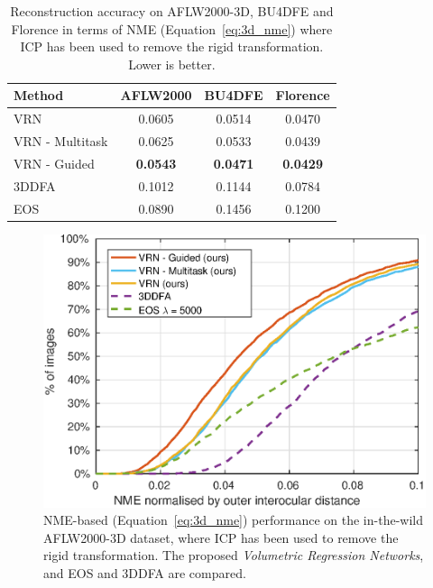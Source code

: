 \begin{table}
  \caption[Numerical performance of 3D face reconstruction with
  ICP]{Reconstruction accuracy on AFLW2000-3D, BU4DFE and Florence in
    terms of NME (Equation~\ref{eq:3d_nme}) where ICP has been used to
    remove the rigid transformation. Lower is better. }
  \label{tab:overviewicp}
  \centering\vspace{1mm}
  \small
\begin{tabular}{|l||c|c|c|}
  \hline
  \textbf{Method}   & \textbf{AFLW2000} & \textbf{BU4DFE} & \textbf{Florence} \\
  \hline\hline
  VRN               & 0.0605 & 0.0514 & 0.0470   \\
  VRN - Multitask   &   0.0625    & 0.0533     & 0.0439        \\
  VRN - Guided      & \textbf{0.0543} & \textbf{0.0471} & \textbf{0.0429}   \\

\hline
  3DDFA~\cite{zhu2016face}             & 0.1012 & 0.1144 & 0.0784   \\
  EOS~\cite{huber2016multiresolution}  & 0.0890 & 0.1456 & 0.1200   \\
  \hline
\end{tabular}
\end{table}

\begin{figure}
  \centering
  \includegraphics[width=0.75\linewidth]{curves-icp/aflw.eps}
  \caption[NME performance on AFLW2000-3D with ICP
  Alignment]{NME-based (Equation~\ref{eq:3d_nme}) performance on the
    in-the-wild AFLW2000-3D dataset, where ICP has been used to remove
    the rigid transformation. The proposed \textit{Volumetric
      Regression Networks}, and EOS and 3DDFA are compared.}
  \label{roc:aflw2000icp}
\end{figure}


